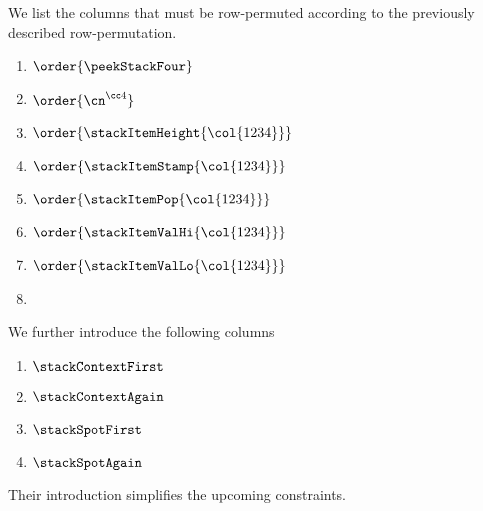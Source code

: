 We list the columns that must be row-permuted according to the previously described row-permutation.
\begin{multicols}{2}
	\begin{enumerate}
		\item $\order{\peekStackFour}$
		\item $\order{\cn^{\cc4}}$
		\item $\order{\stackItemHeight{\col{1234}}}$
		\item $\order{\stackItemStamp{\col{1234}}}$
		\item $\order{\stackItemPop{\col{1234}}}$
		\item $\order{\stackItemValHi{\col{1234}}}$
		\item $\order{\stackItemValLo{\col{1234}}}$
		\item[\vspace{\fill}]
	\end{enumerate}
\end{multicols}
\noindent We further introduce the following columns
\begin{multicols}{2}
        \begin{enumerate}
		\item $\stackContextFirst$
		\item $\stackContextAgain$
		\item $\stackSpotFirst$
		\item $\stackSpotAgain$
        \end{enumerate}
\end{multicols}
\noindent Their introduction simplifies the upcoming constraints.
